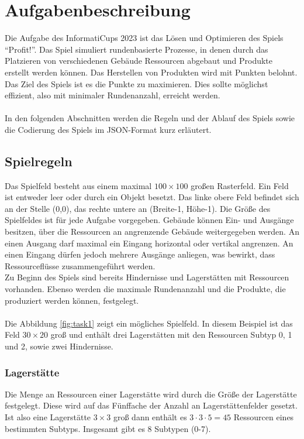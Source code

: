 \section{Aufgabenbeschreibung}\label{cap:aufgabenbeschriebung}
Die Aufgabe des InformatiCups 2023 ist das Lösen und Optimieren des Spiels “Profit!”. 
Das Spiel simuliert rundenbasierte Prozesse, in denen durch das Platzieren von verschiedenen Gebäude Ressourcen abgebaut und Produkte erstellt werden können. Das Herstellen von Produkten wird mit Punkten belohnt. Das Ziel des Spiels ist es die Punkte zu maximieren. Dies sollte möglichst effizient, also mit minimaler Rundenanzahl, erreicht werden.
\\\\
In den folgenden Abschnitten werden die Regeln und der Ablauf des Spiels sowie die Codierung des Spiels im JSON-Format kurz erläutert.

\subsection{Spielregeln}\label{cap:spielregeln}
Das Spielfeld besteht aus einem maximal $100\times100$ großen Rasterfeld. Ein Feld ist entweder leer oder durch ein Objekt besetzt. Das linke obere Feld befindet sich an der Stelle (0,0), das rechte untere an (Breite-1, Höhe-1). Die Größe des Spielfeldes ist für jede Aufgabe vorgegeben. Gebäude können Ein- und Ausgänge besitzen, über die Ressourcen an angrenzende Gebäude weitergegeben werden. An einen Ausgang darf maximal ein Eingang horizontal oder vertikal angrenzen. An einen Eingang dürfen jedoch mehrere Ausgänge anliegen, was bewirkt, dass Ressourceflüsse zusammengeführt werden. 
\\
Zu Beginn des Spiels sind bereits Hindernisse und Lagerstätten mit Ressourcen vorhanden.
Ebenso werden die maximale Rundenanzahl und die Produkte, die produziert werden können, festgelegt.
\\\\
Die Abbildung \ref{fig:task1} zeigt ein mögliches Spielfeld. In diesem Beispiel ist das Feld $30\times20$ groß und enthält drei Lagerstätten mit den Ressourcen Subtyp 0, 1 und 2, sowie zwei Hindernisse.


\subsubsection*{Lagerstätte}
Die Menge an Ressourcen einer Lagerstätte wird durch die Größe der Lagerstätte festgelegt.  Diese wird  auf das Fünffache der Anzahl an Lagerstättenfelder gesetzt. Ist also eine Lagerstätte $3 \times 3$ groß dann enthält es $3\cdot 3 \cdot 5 = 45$ Ressourcen eines bestimmten Subtyps. Insgesamt gibt es 8 Subtypen (0-7).

